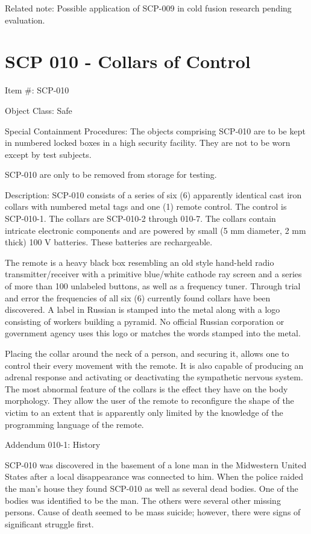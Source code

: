 \documentclass[a4paper, 11pt]{article}
\begin{document}
Related note: Possible application of SCP-009 in cold fusion research pending evaluation.

\section{SCP 010 - Collars of Control}
Item \#: SCP-010

Object Class: Safe

Special Containment Procedures: The objects comprising SCP-010 are to be kept in numbered locked boxes in a high security facility. They are not to be worn except by test subjects.

SCP-010 are only to be removed from storage for testing.

Description: SCP-010 consists of a series of six (6) apparently identical cast iron collars with numbered metal tags and one (1) remote control. The control is SCP-010-1. The collars are SCP-010-2 through 010-7. The collars contain intricate electronic components and are powered by small (5 mm diameter, 2 mm thick) 100 V batteries. These batteries are rechargeable.

The remote is a heavy black box resembling an old style hand-held radio transmitter/receiver with a primitive blue/white cathode ray screen and a series of more than 100 unlabeled buttons, as well as a frequency tuner. Through trial and error the frequencies of all six (6) currently found collars have been discovered. A label in Russian is stamped into the metal along with a logo consisting of workers building a pyramid. No official Russian corporation or government agency uses this logo or matches the words stamped into the metal.

Placing the collar around the neck of a person, and securing it, allows one to control their every movement with the remote. It is also capable of producing an adrenal response and activating or deactivating the sympathetic nervous system. The most abnormal feature of the collars is the effect they have on the body morphology. They allow the user of the remote to reconfigure the shape of the victim to an extent that is apparently only limited by the knowledge of the programming language of the remote.

Addendum 010-1: History

SCP-010 was discovered in the basement of a lone man in the Midwestern United States after a local disappearance was connected to him. When the police raided the man's house they found SCP-010 as well as several dead bodies. One of the bodies was identified to be the man. The others were several other missing persons. Cause of death seemed to be mass suicide; however, there were signs of significant struggle first.
\end{document}
